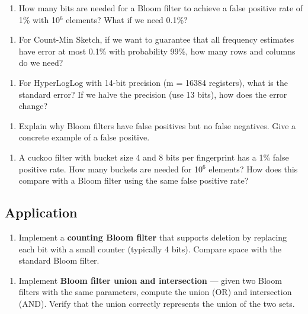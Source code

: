 \begin{enumerate}
\item How many bits are needed for a Bloom filter to achieve a false positive rate of 1\% with 10$^{6}$ elements? What if we need 0.1\%?
\end{enumerate}

\begin{enumerate}
\item For Count-Min Sketch, if we want to guarantee that all frequency estimates have error at most 0.1\% with probability 99\%, how many rows and columns do we need?
\end{enumerate}

\begin{enumerate}
\item For HyperLogLog with 14-bit precision (m = 16384 registers), what is the standard error? If we halve the precision (use 13 bits), how does the error change?
\end{enumerate}

\begin{enumerate}
\item Explain why Bloom filters have false positives but no false negatives. Give a concrete example of a false positive.
\end{enumerate}

\begin{enumerate}
\item A cuckoo filter with bucket size 4 and 8 bits per fingerprint has a 1\% false positive rate. How many buckets are needed for 10$^{6}$ elements? How does this compare with a Bloom filter using the same false positive rate?
\end{enumerate}

\subsection{Application}

\begin{enumerate}
\item Implement a \textbf{counting Bloom filter} that supports deletion by replacing each bit with a small counter (typically 4 bits). Compare space with the standard Bloom filter.
\end{enumerate}

\begin{enumerate}
\item Implement \textbf{Bloom filter union and intersection} — given two Bloom filters with the same parameters, compute the union (OR) and intersection (AND). Verify that the union correctly represents the union of the two sets.
\end{enumerate}


